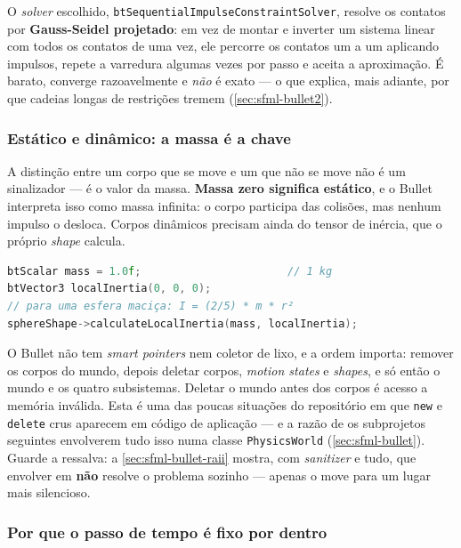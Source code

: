 O \emph{solver} escolhido, \texttt{btSequentialImpulseConstraintSolver}, resolve
os contatos por \textbf{Gauss-Seidel projetado}: em vez de montar e inverter um
sistema linear com todos os contatos de uma vez, ele percorre os contatos um a
um aplicando impulsos, repete a varredura algumas vezes por passo e aceita a
aproximação. É barato, converge razoavelmente e \emph{não} é exato --- o que
explica, mais adiante, por que cadeias longas de restrições tremem
(\cref{sec:sfml-bullet2}).

\subsubsection{Estático e dinâmico: a massa é a chave}

A distinção entre um corpo que se move e um que não se move não é um sinalizador
--- é o valor da massa. \textbf{Massa zero significa estático}, e o Bullet
interpreta isso como massa infinita: o corpo participa das colisões, mas nenhum
impulso o desloca. Corpos dinâmicos precisam ainda do tensor de inércia, que o
próprio \emph{shape} calcula.

\begin{lstlisting}[style=bt, language=C++,
    caption={O tensor de inércia sai da forma, não do usuário --- \texttt{src/collision/main.cpp}.}]
btScalar mass = 1.0f;                       // 1 kg
btVector3 localInertia(0, 0, 0);
// para uma esfera maciça: I = (2/5) * m * r²
sphereShape->calculateLocalInertia(mass, localInertia);
\end{lstlisting}

\begin{regra}
O Bullet não tem \emph{smart pointers} nem coletor de lixo, e a ordem importa:
remover os corpos do mundo, depois deletar corpos, \emph{motion states} e
\emph{shapes}, e só então o mundo e os quatro subsistemas. Deletar o mundo antes
dos corpos é acesso a memória inválida. Esta é uma das poucas situações do
repositório em que \texttt{new} e \texttt{delete} crus aparecem em código de
aplicação --- e a razão de os subprojetos seguintes envolverem tudo isso numa
classe \texttt{PhysicsWorld} (\cref{sec:sfml-bullet}). Guarde a ressalva: a
\cref{sec:sfml-bullet-raii} mostra, com \emph{sanitizer} e tudo, que envolver em
 \textbf{não} resolve o problema sozinho --- apenas o
move para um lugar mais silencioso.
\end{regra}

\subsubsection{Por que o passo de tempo é fixo por dentro}

